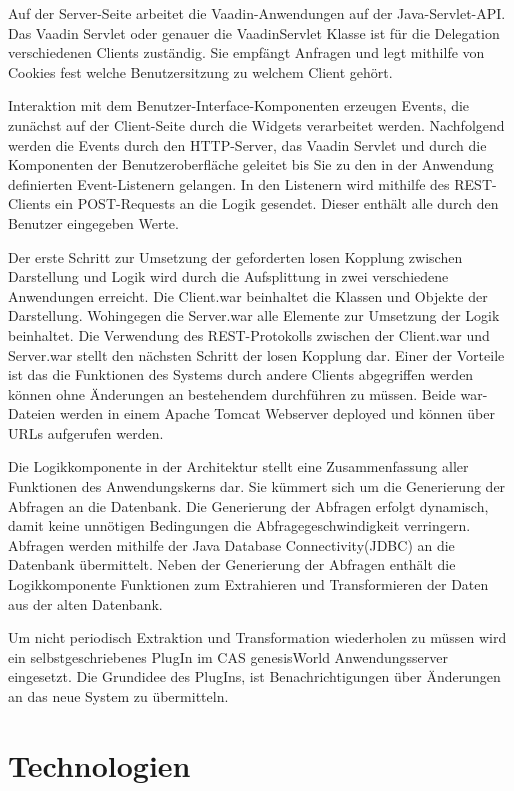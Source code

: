 Auf der Server-Seite arbeitet die Vaadin-Anwendungen auf der Java-Servlet-API. Das Vaadin Servlet oder genauer die VaadinServlet Klasse ist für die Delegation verschiedenen Clients zuständig. Sie empfängt Anfragen und legt mithilfe von Cookies fest welche Benutzersitzung zu welchem Client gehört.

Interaktion mit dem Benutzer-Interface-Komponenten erzeugen Events, die zunächst auf der Client-Seite durch die Widgets verarbeitet werden. Nachfolgend werden die Events durch den HTTP-Server, das Vaadin Servlet und durch die Komponenten der Benutzeroberfläche geleitet bis Sie zu den in der Anwendung definierten Event-Listenern gelangen. In den Listenern wird mithilfe des REST-Clients ein POST-Requests an die Logik gesendet. Dieser enthält alle durch den Benutzer eingegeben Werte. 

Der erste Schritt zur Umsetzung der geforderten losen Kopplung zwischen Darstellung und Logik wird durch die Aufsplittung in zwei verschiedene Anwendungen erreicht. Die Client.war beinhaltet die Klassen und Objekte der Darstellung. Wohingegen die Server.war alle Elemente zur Umsetzung der Logik beinhaltet. Die Verwendung des REST-Protokolls zwischen der Client.war und Server.war stellt den nächsten Schritt der losen Kopplung dar. Einer der Vorteile ist das die Funktionen des Systems durch andere Clients abgegriffen werden können ohne Änderungen an bestehendem durchführen zu müssen. Beide war-Dateien werden in einem Apache Tomcat Webserver deployed und können über URLs aufgerufen werden.

Die Logikkomponente in der Architektur stellt eine Zusammenfassung aller Funktionen des Anwendungskerns dar. Sie kümmert sich um die Generierung der Abfragen an die Datenbank. Die Generierung der Abfragen erfolgt dynamisch, damit keine unnötigen Bedingungen die Abfragegeschwindigkeit verringern. Abfragen werden mithilfe der Java Database Connectivity(JDBC) an die Datenbank übermittelt. Neben der Generierung der Abfragen enthält die Logikkomponente Funktionen zum Extrahieren und Transformieren der Daten aus der alten Datenbank. 

Um nicht periodisch Extraktion und Transformation wiederholen zu müssen wird ein selbstgeschriebenes PlugIn im CAS genesisWorld Anwendungsserver eingesetzt. Die Grundidee des PlugIns, ist Benachrichtigungen über Änderungen an das neue System zu übermitteln.

\section{Technologien}

